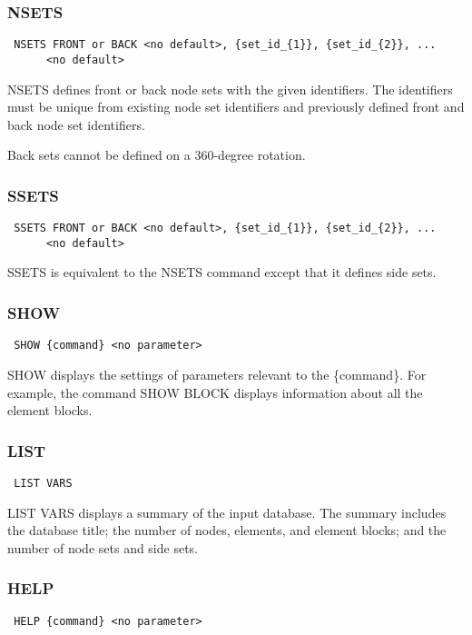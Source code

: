 \subsubsection{NSETS}
\begin{verbatim}
 NSETS FRONT or BACK <no default>, {set_id_{1}}, {set_id_{2}}, ...
      <no default>
\end{verbatim}

NSETS defines front or back node sets with the given identifiers.  The
identifiers must be unique from existing node set identifiers and
previously defined front and back node set identifiers.

Back sets cannot be defined on a 360-degree rotation.
\subsubsection{SSETS}
\begin{verbatim}
 SSETS FRONT or BACK <no default>, {set_id_{1}}, {set_id_{2}}, ...
      <no default>
\end{verbatim}

SSETS is equivalent to the NSETS command except that it defines side
sets.
\subsubsection{SHOW}
\begin{verbatim}
 SHOW {command} <no parameter>
\end{verbatim}

SHOW displays the settings of parameters relevant to the \{command\}.  For
example, the command SHOW BLOCK displays information about all the
element blocks.
\subsubsection{LIST}
\begin{verbatim}
 LIST VARS
\end{verbatim}

LIST VARS displays a summary of the input database.  The summary
includes the database title; the number of nodes, elements, and element
blocks; and the number of node sets and side sets.
\subsubsection{HELP}
\begin{verbatim}
 HELP {command} <no parameter>
\end{verbatim}

